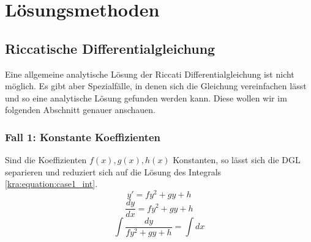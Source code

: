 \section{Lösungsmethoden} \label{kra:section:loesung}

\subsection{Riccatische Differentialgleichung} \label{kra:loesung:riccati}
Eine allgemeine analytische Lösung der Riccati Differentialgleichung ist nicht möglich.
Es gibt aber Spezialfälle, in denen sich die Gleichung vereinfachen lässt und so eine analytische Lösung gefunden werden kann.
Diese wollen wir im folgenden Abschnitt genauer anschauen.

\subsubsection{Fall 1: Konstante Koeffizienten}
Sind die Koeffizienten $f(x), g(x), h(x)$ Konstanten, so lässt sich die DGL separieren und reduziert sich auf die Lösung des Integrals \ref{kra:equation:case1_int}.
\begin{equation}
    y' = fy^2 + gy + h 
\end{equation}
\begin{equation}
    \frac{dy}{dx} = fy^2 + gy + h
\end{equation}
\begin{equation} \label{kra:equation:case1_int}
    \int \frac{dy}{fy^2 + gy + h} = \int dx
\end{equation}

